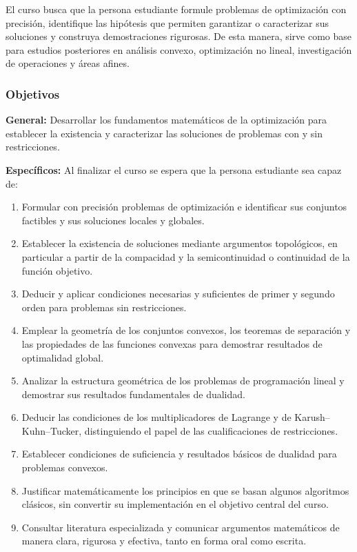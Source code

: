 \begin{refsection}
El curso busca que la persona estudiante formule problemas de optimización con precisión, identifique las hipótesis que permiten garantizar o caracterizar sus soluciones y construya demostraciones rigurosas. De esta manera, sirve como base para estudios posteriores en análisis convexo, optimización no lineal, investigación de operaciones y áreas afines.

\subsubsection*{Objetivos}

\textbf{General:} Desarrollar los fundamentos matemáticos de la optimización para establecer la existencia y caracterizar las soluciones de problemas con y sin restricciones.

\textbf{Específicos:} Al finalizar el curso se espera que la persona estudiante sea capaz de:

\begin{enumerate}
\item Formular con precisión problemas de optimización e identificar sus conjuntos factibles y sus soluciones locales y globales.
\item Establecer la existencia de soluciones mediante argumentos topológicos, en particular a partir de la compacidad y la semicontinuidad o continuidad de la función objetivo.
\item Deducir y aplicar condiciones necesarias y suficientes de primer y segundo orden para problemas sin restricciones.
\item Emplear la geometría de los conjuntos convexos, los teoremas de separación y las propiedades de las funciones convexas para demostrar resultados de optimalidad global.
\item Analizar la estructura geométrica de los problemas de programación lineal y demostrar sus resultados fundamentales de dualidad.
\item Deducir las condiciones de los multiplicadores de Lagrange y de Karush--Kuhn--Tucker, distinguiendo el papel de las cualificaciones de restricciones.
\item Establecer condiciones de suficiencia y resultados básicos de dualidad para problemas convexos.
\item Justificar matemáticamente los principios en que se basan algunos algoritmos clásicos, sin convertir su implementación en el objetivo central del curso.
\item Consultar literatura especializada y comunicar argumentos matemáticos de manera clara, rigurosa y efectiva, tanto en forma oral como escrita.
\end{enumerate}


\end{refsection}
